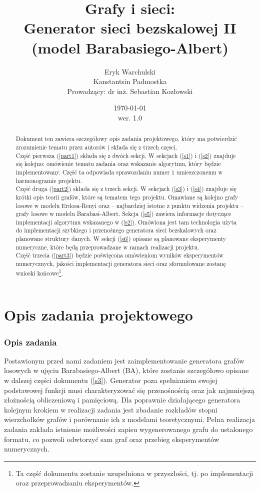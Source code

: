 \documentclass{article}
\title{Grafy i sieci: \\ Generator sieci bezskalowej II (model Barabasiego-Albert)}
\author{Eryk Warchulski \\ Kanstantsin Padmostka \\ Prowadzący: dr inż. Sebastian Kozłowski}%
\date{\today\\wer. 1.0}
\def\lecturemark{}
\newcommand{\spr}[1]{\part{#1}\def\lecturemark{\partname\ \thepart: #1}}
\renewcommand{\partname}{Sprawozdanie}
\renewcommand{\thepart}{\arabic{part}}
\begin{document}
\maketitle
{\footnotesize{\tableofcontents}}
\newpage
{}
\vspace*{\fill}
\begin{abstract}
	Dokument ten zawiera szczegółowy opis zadania projektowego, który ma potwierdzić zrozumienie tematu przez autorów i składa się z trzech częsci.\\
	Część pierwsza (\ref{part1}) składa się z dwóch sekcji. W sekcjach (\ref{s1}) i (\ref{s2}) znajduje się kolejno: omówienie tematu zadania oraz wskazanie algorytmu, który będzie implementowany. Część ta odpowiada sprawozdaniu numer 1 umieszczonemu w harmonogramie projektu. \\ 
	Część druga (\ref{part2}) składa się z trzech sekcji. W sekcjach (\ref{s3}) i (\ref{s4}) znajduje się krótki opis teorii grafów, które są
	tematem tego projektu. Omawiane są kolejno grafy losowe w modelu Erdosa-Renyi oraz -- najbardziej istotne z punktu widzenia projektu -- 
	grafy losowe w modelu Barabasi-Albert.
	Sekcja (\ref{s5}) zawiera informacje dotyczące implementacji algorytmu wskazanego w (\ref{s2}). Omówiona jest tam technologia użyta do implementacji
	szybkiego i przenośnego generatora sieci bezskalowych oraz planowane struktury danych. W sekcji (\ref{s6}) opisane są planowane eksperymenty
	numeryczne, które będą przeprowadzane w ramach realizacji projektu. \\
	Część trzecia (\ref{part3}) będzie poświęcona omówieniom wyników eksperymentów numerycznych, jakości implementacji generatora sieci oraz sformułowane zostanę wnioski końcowe\footnote{Ta część dokumentu zostanie uzupełniona w przyszłości, tj. po implementacji oraz przeprowadzaniu eksperymentów.}. 
\end{abstract}
\vspace*{\fill}
\newpage
\spr{Opis zadania projektowego \label{part1}}
\section{Opis zadania \label{s1}}
	Postawionym przed nami zadaniem jest zaimplementowanie generatora grafów losowych w ujęciu Barabasiego-Albert (BA), które zostanie szczegółowo
	opisane w dalszej części dokumentu (\ref{s3}). Generator poza spełnianiem swojej podstawowej funkcji musi charakteryzować się
	przenośnością oraz jak najmniejszą złożnością obliczeniową i pamięciową. Dla poprawnie działającego generatora kolejnym krokiem w realizacji
	zadania jest zbadanie rozkładów stopni wierzchołków grafów i porównanie ich z modelami teoretycznymi. Pełna realizacja zadania zakłada istnienie
	możliwości zapisu wygenerowanego grafu do ustalonego formatu, co pozwoli odwtorzyć sam graf oraz przebieg eksperymentów numerycznych.\\
\end{document}
